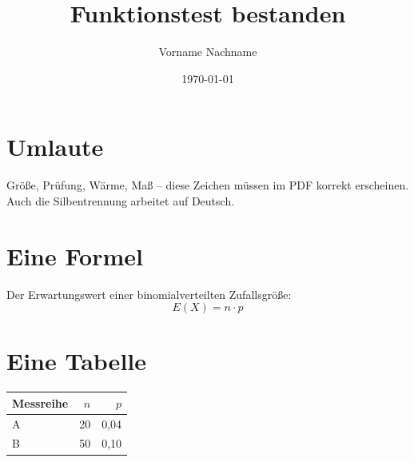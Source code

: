 \documentclass[11pt]{scrartcl}
\title{Funktionstest bestanden}
\author{Vorname Nachname}   %
\date{\today}
\begin{document}
\maketitle

\section{Umlaute}
Größe, Prüfung, Wärme, Maß -- diese Zeichen müssen im PDF korrekt
erscheinen. Auch die Silbentrennung arbeitet auf Deutsch.

\section{Eine Formel}
Der Erwartungswert einer binomialverteilten Zufallsgröße:
\begin{equation}
  E(X) = n \cdot p
\end{equation}

\section{Eine Tabelle}
\begin{center}
\begin{tabular}{lrr}
  \hline
  Messreihe & $n$ & $p$ \\
  \hline
  A & 20 & 0,04 \\
  B & 50 & 0,10 \\
  \hline
\end{tabular}
\end{center}
\end{document}
